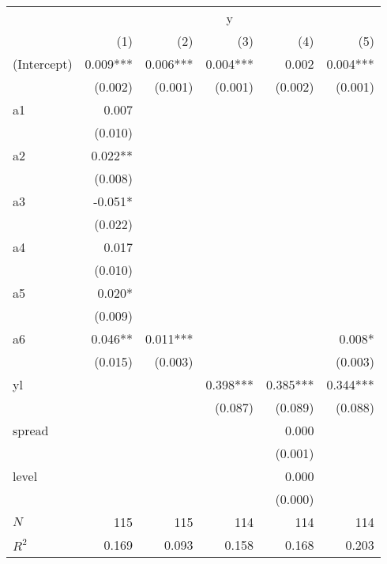 \begin{tabular}{lrrrrr}
\toprule
            &                 \multicolumn{5}{c}{y}                \\ 
\cmidrule(lr){2-6} 
            &      (1) &      (2) &      (3) &      (4) &      (5) \\ 
\midrule
(Intercept) & 0.009*** & 0.006*** & 0.004*** &    0.002 & 0.004*** \\ 
            &  (0.002) &  (0.001) &  (0.001) &  (0.002) &  (0.001) \\ 
a1          &    0.007 &          &          &          &          \\ 
            &  (0.010) &          &          &          &          \\ 
a2          &  0.022** &          &          &          &          \\ 
            &  (0.008) &          &          &          &          \\ 
a3          &  -0.051* &          &          &          &          \\ 
            &  (0.022) &          &          &          &          \\ 
a4          &    0.017 &          &          &          &          \\ 
            &  (0.010) &          &          &          &          \\ 
a5          &   0.020* &          &          &          &          \\ 
            &  (0.009) &          &          &          &          \\ 
a6          &  0.046** & 0.011*** &          &          &   0.008* \\ 
            &  (0.015) &  (0.003) &          &          &  (0.003) \\ 
yl          &          &          & 0.398*** & 0.385*** & 0.344*** \\ 
            &          &          &  (0.087) &  (0.089) &  (0.088) \\ 
spread      &          &          &          &    0.000 &          \\ 
            &          &          &          &  (0.001) &          \\ 
level       &          &          &          &    0.000 &          \\ 
            &          &          &          &  (0.000) &          \\ 
\midrule
$N$         &      115 &      115 &      114 &      114 &      114 \\ 
$R^2$       &    0.169 &    0.093 &    0.158 &    0.168 &    0.203 \\ 
\bottomrule
\end{tabular}
